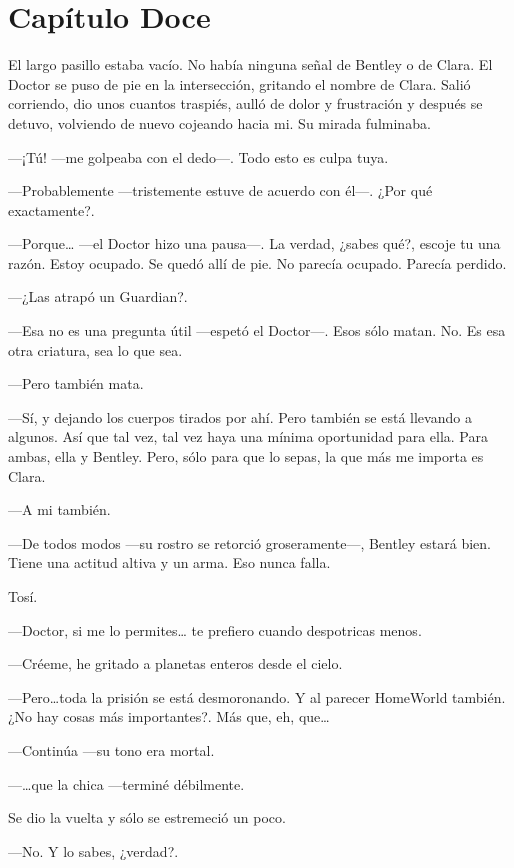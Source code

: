 \chapter*{Capítulo Doce}

El largo pasillo estaba vacío. No había ninguna señal de Bentley o de
Clara. El Doctor se puso de pie en la intersección, gritando el nombre
de Clara. Salió corriendo, dio unos cuantos traspiés, aulló de dolor y
frustración y después se detuvo, volviendo de nuevo cojeando hacia mi.
Su mirada fulminaba.

---¡Tú! ---me golpeaba con el dedo---. Todo esto es culpa tuya.

---Probablemente ---tristemente estuve de acuerdo con él---. ¿Por qué
exactamente?.

---Porque\ldots{} ---el Doctor hizo una pausa---. La verdad, ¿sabes
qué?, escoje tu una razón. Estoy ocupado. Se quedó allí de pie. No
parecía ocupado. Parecía perdido.

---¿Las atrapó un Guardian?.

---Esa no es una pregunta útil ---espetó el Doctor---. Esos sólo matan.
No. Es esa otra criatura, sea lo que sea.

---Pero también mata.

---Sí, y dejando los cuerpos tirados por ahí. Pero también se está
llevando a algunos. Así que tal vez, tal vez haya una mínima oportunidad
para ella. Para ambas, ella y Bentley. Pero, sólo para que lo sepas, la
que más me importa es Clara.

---A mi también.

---De todos modos ---su rostro se retorció groseramente---, Bentley
estará bien. Tiene una actitud altiva y un arma. Eso nunca falla.

Tosí.

---Doctor, si me lo permites\ldots{} te prefiero cuando despotricas
menos.

---Créeme, he gritado a planetas enteros desde el cielo.

---Pero\ldots{}toda la prisión se está desmoronando. Y al parecer
HomeWorld también. ¿No hay cosas más importantes?. Más que, eh,
que\ldots{}

---Continúa ---su tono era mortal.

---\ldots{}que la chica ---terminé débilmente.

Se dio la vuelta y sólo se estremeció un poco.

---No. Y lo sabes, ¿verdad?.

